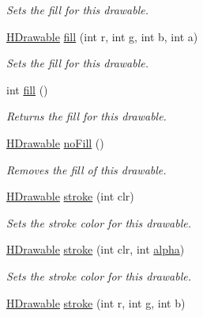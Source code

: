 \begin{DoxyCompactItemize}
\begin{DoxyCompactList}\small\item\em Sets the fill for this drawable. \end{DoxyCompactList}\item 
\hyperlink{classhype_1_1core_1_1drawable_1_1_h_drawable}{H\-Drawable} \hyperlink{classhype_1_1core_1_1drawable_1_1_h_drawable_a5b76e82c424bffa2f7d37d8551d44bec}{fill} (int r, int g, int b, int a)
\begin{DoxyCompactList}\small\item\em Sets the fill for this drawable. \end{DoxyCompactList}\item 
int \hyperlink{classhype_1_1core_1_1drawable_1_1_h_drawable_a3ea1f5a07f50a01c5210a059056758a7}{fill} ()
\begin{DoxyCompactList}\small\item\em Returns the fill for this drawable. \end{DoxyCompactList}\item 
\hyperlink{classhype_1_1core_1_1drawable_1_1_h_drawable}{H\-Drawable} \hyperlink{classhype_1_1core_1_1drawable_1_1_h_drawable_ad38c45d894aa73c847c64779cdb5d0c2}{no\-Fill} ()
\begin{DoxyCompactList}\small\item\em Removes the fill of this drawable. \end{DoxyCompactList}\item 
\hyperlink{classhype_1_1core_1_1drawable_1_1_h_drawable}{H\-Drawable} \hyperlink{classhype_1_1core_1_1drawable_1_1_h_drawable_ac83d29512fdfb12149aad03b9974edc0}{stroke} (int clr)
\begin{DoxyCompactList}\small\item\em Sets the stroke color for this drawable. \end{DoxyCompactList}\item 
\hyperlink{classhype_1_1core_1_1drawable_1_1_h_drawable}{H\-Drawable} \hyperlink{classhype_1_1core_1_1drawable_1_1_h_drawable_ab454a46a31c17a7d3642e2a19d372c4a}{stroke} (int clr, int \hyperlink{classhype_1_1core_1_1drawable_1_1_h_drawable_ae0711e3bde7279c84b0282f928bbe699}{alpha})
\begin{DoxyCompactList}\small\item\em Sets the stroke color for this drawable. \end{DoxyCompactList}\item 
\hyperlink{classhype_1_1core_1_1drawable_1_1_h_drawable}{H\-Drawable} \hyperlink{classhype_1_1core_1_1drawable_1_1_h_drawable_aa5fea77777a386870ab92da94f502892}{stroke} (int r, int g, int b)

\end{DoxyCompactItemize}
